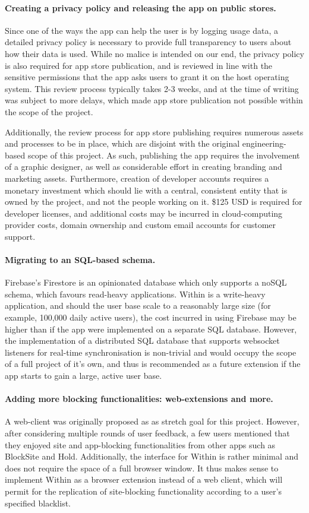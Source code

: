 \paragraph{Creating a privacy policy and releasing the app on public stores.} Since one of the ways the app can help the user is by logging usage data, a detailed privacy policy is necessary to provide full transparency to users about how their data is used. While no malice is intended on our end, the privacy policy is also required for app store publication, and is reviewed in line with the sensitive permissions that the app asks users to grant it on the host operating system. This review process typically takes 2-3 weeks, and at the time of writing was subject to more delays, which made app store publication not possible within the scope of the project.

Additionally, the review process for app store publishing requires numerous assets and processes to be in place, which are disjoint with the original engineering-based scope of this project. As such, publishing the app requires the involvement of a graphic designer, as well as considerable effort in creating branding and marketing assets. Furthermore, creation of developer accounts requires a monetary investment which should lie with a central, consistent entity that is owned by the project, and not the people working on it. \$125 USD is required for developer licenses, and additional costs may be incurred in cloud-computing provider costs, domain ownership and custom email accounts for customer support.

\paragraph{Migrating to an SQL-based schema.} Firebase's Firestore is an opinionated database which only supports a noSQL schema, which favours read-heavy applications. Within is a write-heavy application, and should the user base scale to a reasonably large size (for example, 100,000 daily active users), the cost incurred in using Firebase may be higher than if the app were implemented on a separate SQL database. However, the implementation of a distributed SQL database that supports websocket listeners for real-time synchronisation is non-trivial and would occupy the scope of a full project of it's own, and thus is recommended as a future extension if the app starts to gain a large, active user base.

\paragraph{Adding more blocking functionalities: web-extensions and more. }
A web-client was originally proposed as as stretch goal for this project. However, after considering multiple rounds of user feedback, a few users mentioned that they enjoyed site and app-blocking functionalities from other apps such as BlockSite and Hold. Additionally, the interface for Within is rather minimal and does not require the space of a full browser window. It thus makes sense to implement Within as a browser extension instead of a web client, which will permit for the replication of site-blocking functionality according to a user's specified blacklist.

